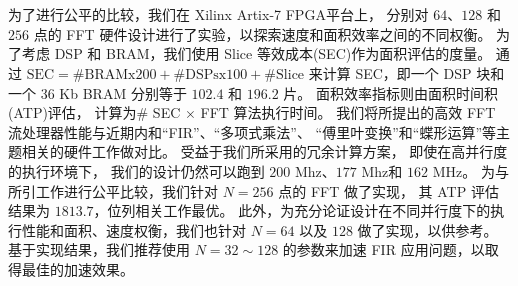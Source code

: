 \section{}

为了进行公平的比较，我们在 Xilinx Artix-7 FPGA平台上，
分别对 $64$、$128$ 和 $256$ 点的 FFT 硬件设计进行了实验，以探索速度和面积效率之间的不同权衡。
为了考虑 DSP 和 BRAM，我们使用 Slice 等效成本(SEC)作为面积评估的度量。
通过 $\mathrm{SEC=\# BRAM x 200+\# DSPsx 100+\# Slice}$ 来计算 SEC，即一个 DSP 块和一个 36
 Kb BRAM 分别等于 $102.4$ 和 $196.2$ 片。
面积效率指标则由面积时间积(ATP)评估，
计算为\# SEC $\times$ FFT 算法执行时间。
我们将所提出的高效 FFT 流处理器性能与近期内和``FIR''、``多项式乘法''、
``傅里叶变换''和``蝶形运算''等主题相关的硬件工作做对比。
受益于我们所采用的冗余计算方案，
即使在高并行度的执行环境下，
我们的设计仍然可以跑到 $200$ Mhz、$177$ Mhz和 $162$ MHz。
为与所引工作进行公平比较，我们针对 $N=256$ 点的 FFT 做了实现，
其 ATP 评估结果为 $1813.7$，位列相关工作最优。
此外，为充分论证设计在不同并行度下的执行性能和面积、速度权衡，我们也针对 $N=64$ 以及 $128$ 做了实现，以供参考。
基于实现结果，我们推荐使用 $N=32\sim 128$ 的参数来加速 FIR 应用问题，以取得最佳的加速效果。